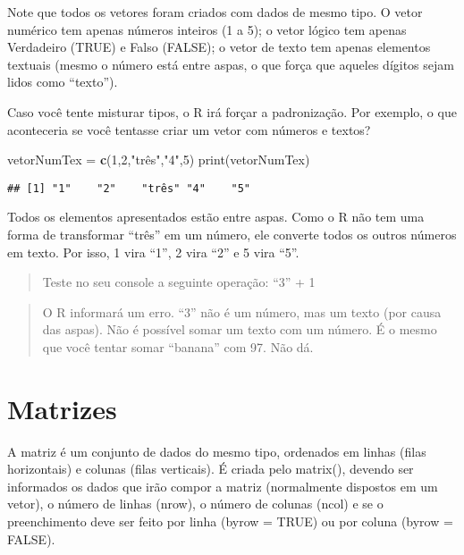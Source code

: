 \documentclass[
]{book}
\newenvironment{Shaded}{\begin{snugshade}}{\end{snugshade}}
\newcommand{\DecValTok}[1]{\textcolor[rgb]{0.00,0.00,0.81}{#1}}
\newcommand{\KeywordTok}[1]{\textcolor[rgb]{0.13,0.29,0.53}{\textbf{#1}}}
\newcommand{\NormalTok}[1]{#1}
\newcommand{\StringTok}[1]{\textcolor[rgb]{0.31,0.60,0.02}{#1}}
\begin{document}
Note que todos os vetores foram criados com dados de mesmo tipo. O vetor numérico tem apenas números inteiros (1 a 5); o vetor lógico tem apenas Verdadeiro (TRUE) e Falso (FALSE); o vetor de texto tem apenas elementos textuais (mesmo o número está entre aspas, o que força que aqueles dígitos sejam lidos como ``texto'').

Caso você tente misturar tipos, o R irá forçar a padronização. Por exemplo, o que aconteceria se você tentasse criar um vetor com números e textos?

\begin{Shaded}
\begin{Highlighting}[]
\NormalTok{vetorNumTex =}\StringTok{ }\KeywordTok{c}\NormalTok{(}\DecValTok{1}\NormalTok{,}\DecValTok{2}\NormalTok{,}\StringTok{"três","}\DecValTok{4}\StringTok{",5)}
\StringTok{print(vetorNumTex)}
\end{Highlighting}
\end{Shaded}

\begin{verbatim}
## [1] "1"    "2"    "três" "4"    "5"
\end{verbatim}

Todos os elementos apresentados estão entre aspas. Como o R não tem uma forma de transformar ``três'' em um número, ele converte todos os outros números em texto. Por isso, 1 vira ``1'', 2 vira ``2'' e 5 vira ``5''.

\begin{quote}
Teste no seu console a seguinte operação: ``3'' + 1
\end{quote}

\begin{quote}
O R informará um erro. ``3'' não é um número, mas um texto (por causa das aspas). Não é possível somar um texto com um número. É o mesmo que você tentar somar ``banana'' com 97. Não dá.
\end{quote}

\hypertarget{matrizes}{%
\section{Matrizes}\label{matrizes}}

A matriz é um conjunto de dados do mesmo tipo, ordenados em linhas (filas horizontais) e colunas (filas verticais). É criada pelo matrix(), devendo ser informados os dados que irão compor a matriz (normalmente dispostos em um vetor), o número de linhas (nrow), o número de colunas (ncol) e se o preenchimento deve ser feito por linha (byrow = TRUE) ou por coluna (byrow = FALSE).
\end{document}
